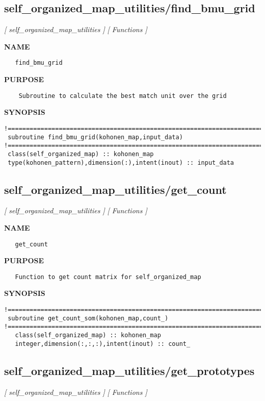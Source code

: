 \documentclass{article}
\begin{document}
\subsection{self\_organized\_map\_utilities/find\_bmu\_grid}
\textsl{[ self\_organized\_map\_utilities ]}
\textsl{[ Functions ]}

\label{ch:robo45}
\label{ch:self_organized_map_utilities_find_bmu_grid}
\textbf{NAME}
\begin{verbatim}
   find_bmu_grid
\end{verbatim}
\textbf{PURPOSE}
\begin{verbatim}
    Subroutine to calculate the best match unit over the grid  
\end{verbatim}
\textbf{SYNOPSIS}
\begin{verbatim}
!========================================================================================
 subroutine find_bmu_grid(kohonen_map,input_data)
!========================================================================================
 class(self_organized_map) :: kohonen_map
 type(kohonen_pattern),dimension(:),intent(inout) :: input_data
\end{verbatim}
\newpage
\subsection{self\_organized\_map\_utilities/get\_count}
\textsl{[ self\_organized\_map\_utilities ]}
\textsl{[ Functions ]}

\label{ch:robo46}
\label{ch:self_organized_map_utilities_get_count}
\textbf{NAME}
\begin{verbatim}
   get_count
\end{verbatim}
\textbf{PURPOSE}
\begin{verbatim}
   Function to get count matrix for self_organized_map 
\end{verbatim}
\textbf{SYNOPSIS}
\begin{verbatim}
!========================================================================================
 subroutine get_count_som(kohonen_map,count_)
!========================================================================================
   class(self_organized_map) :: kohonen_map
   integer,dimension(:,:,:),intent(inout) :: count_
\end{verbatim}
\newpage
\subsection{self\_organized\_map\_utilities/get\_prototypes}
\textsl{[ self\_organized\_map\_utilities ]}
\textsl{[ Functions ]}
\end{document}
